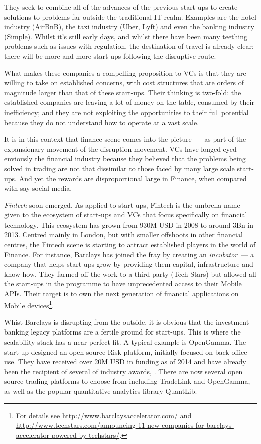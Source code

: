 \documentclass{book}
\begin{document}
They seek to combine all of the advances of the previous start-ups to
create solutions to problems far outside the traditional IT
realm. Examples are the hotel industry (AirBnB), the taxi industry
(Uber, Lyft) and even the banking industry (Simple). Whilst it's still
early days, and whilst there have been many teething problems such as
issues with regulation, the destination of travel is already clear:
there will be more and more start-ups following the disruptive route.

What makes these companies a compelling proposition to VCs is that
they are willing to take on established concerns, with cost structures
that are orders of magnitude larger than that of these
start-ups. Their thinking is two-fold: the established companies are
leaving a lot of money on the table, consumed by their inefficiency;
and they are not exploiting the opportunities to their full potential
because they do not understand how to operate at a vast scale.

It is in this context that finance scene comes into the picture~--- as
part of the expansionary movement of the disruption movement. VCs have
longed eyed enviously the financial industry because they believed
that the problems being solved in trading are not that dissimilar to
those faced by many large scale start-ups. And yet the rewards are
disproportional large in Finance, when compared with say social media.

\emph{Fintech} soon emerged. As applied to start-ups, Fintech is the
umbrella name given to the ecosystem of start-ups and VCs that focus
specifically on financial technology. This ecosystem has grown from
930M USD in 2008 to around 3Bn in 2013\cite{Accenture01}. Centred
mainly in London, but with smaller offshoots in other financial
centres, the Fintech scene is starting to attract established players
in the world of Finance. For instance, Barclays has joined the fray by
creating an \emph{incubator}~--- a company that helps start-ups grow
by providing them capital, infrastructure and know-how. They farmed
off the work to a third-party (Tech Stars) but allowed all the
start-ups in the programme to have unprecedented access to their
Mobile APIs. Their target is to own the next generation of financial
applications on Mobile devices\footnote{For details see \sloppy
  \url{http://www.barclaysaccelerator.com/} and \sloppy
  \url{http://www.techstars.com/announcing-11-new-companies-for-barclays-accelerator-powered-by-techstars/}.}.

Whist Barclays is disrupting from the outside, it is obvious that the
investment banking legacy platforms are a fertile ground for
start-ups. This is where the scalability stack has a near-perfect
fit. A typical example is OpenGamma. The start-up designed an open
source Risk platform, initially focused on back office use. They have
received over 20M USD in funding as of 2014\cite{OpenGamma01} and have
already been the recipient of several of industry
awards\cite{OpenGamma02}, \cite{RiskFocus01}. There are now several
open source trading platforms to choose from including TradeLink and
OpenGamma, as well as the popular quantitative analytics library
QuantLib.
\end{document}

